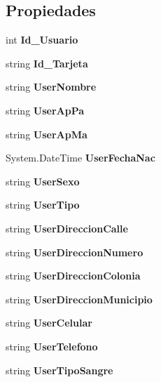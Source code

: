 \subsection*{Propiedades}
\begin{DoxyCompactItemize}
\item 
int {\bf Id\-\_\-\-Usuario}\hspace{0.3cm}{\ttfamily  [get, set]}
\item 
string {\bf Id\-\_\-\-Tarjeta}\hspace{0.3cm}{\ttfamily  [get, set]}
\item 
string {\bf User\-Nombre}\hspace{0.3cm}{\ttfamily  [get, set]}
\item 
string {\bf User\-Ap\-Pa}\hspace{0.3cm}{\ttfamily  [get, set]}
\item 
string {\bf User\-Ap\-Ma}\hspace{0.3cm}{\ttfamily  [get, set]}
\item 
System.\-Date\-Time {\bf User\-Fecha\-Nac}\hspace{0.3cm}{\ttfamily  [get, set]}
\item 
string {\bf User\-Sexo}\hspace{0.3cm}{\ttfamily  [get, set]}
\item 
string {\bf User\-Tipo}\hspace{0.3cm}{\ttfamily  [get, set]}
\item 
string {\bf User\-Direccion\-Calle}\hspace{0.3cm}{\ttfamily  [get, set]}
\item 
string {\bf User\-Direccion\-Numero}\hspace{0.3cm}{\ttfamily  [get, set]}
\item 
string {\bf User\-Direccion\-Colonia}\hspace{0.3cm}{\ttfamily  [get, set]}
\item 
string {\bf User\-Direccion\-Municipio}\hspace{0.3cm}{\ttfamily  [get, set]}
\item 
string {\bf User\-Celular}\hspace{0.3cm}{\ttfamily  [get, set]}
\item 
string {\bf User\-Telefono}\hspace{0.3cm}{\ttfamily  [get, set]}
\item 
string {\bf User\-Tipo\-Sangre}\hspace{0.3cm}{\ttfamily  [get, set]}
\item 

\end{DoxyCompactItemize}
